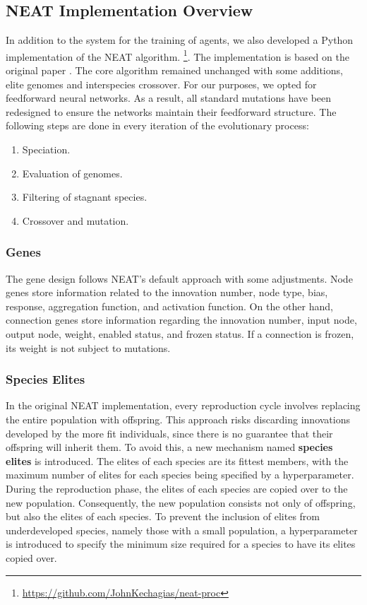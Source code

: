 \documentclass[letterpaper, 12pt]{article}
\begin{document}
\subsection*{NEAT Implementation Overview}
In addition to the system for the training of agents, we also developed a Python
implementation of the NEAT algorithm.
\footnote{\url{https://github.com/JohnKechagias/neat-proc}}. The implementation is based
on the original paper \cite{stanley:ec02}. The core algorithm remained unchanged with
some additions, elite genomes and interspecies crossover. For our purposes, we opted for
feedforward neural networks. As a result, all standard mutations have been redesigned to
ensure the networks maintain their feedforward structure. The following steps are done
in every iteration of the evolutionary process:
\begin{enumerate}
  \item Speciation.
  \item Evaluation of genomes.
  \item Filtering of stagnant species.
  \item Crossover and mutation.
\end{enumerate}

\subsubsection*{Genes}
The gene design follows NEAT's default approach with some adjustments. Node genes store
information related to the innovation number, node type, bias, response, aggregation
function, and activation function. On the other hand, connection genes store information
regarding the innovation number, input node, output node, weight, enabled status, and
frozen status. If a connection is frozen, its weight is not subject to mutations.

\subsubsection*{Species Elites}
In the original NEAT implementation, every reproduction cycle involves replacing the
entire population with offspring. This approach risks discarding innovations developed
by the more fit individuals, since there is no guarantee that their offspring will
inherit them. To avoid this, a new mechanism named \textbf{species elites} is
introduced. The elites of each species are its fittest members, with the maximum number
of elites for each species being specified by a hyperparameter. During the reproduction
phase, the elites of each species are copied over to the new population. Consequently,
the new population consists not only of offspring, but also the elites of each species.
To prevent the inclusion of elites from underdeveloped species, namely those with a
small population, a hyperparameter is introduced to specify the minimum size required
for a species to have its elites copied over.
\end{document}
